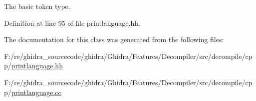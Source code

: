The basic token type. 



Definition at line 95 of file printlanguage.\+hh.



The documentation for this class was generated from the following files\+:\begin{DoxyCompactItemize}
\item 
F\+:/re/ghidra\+\_\+sourcecode/ghidra/\+Ghidra/\+Features/\+Decompiler/src/decompile/cpp/\mbox{\hyperlink{printlanguage_8hh}{printlanguage.\+hh}}\item 
F\+:/re/ghidra\+\_\+sourcecode/ghidra/\+Ghidra/\+Features/\+Decompiler/src/decompile/cpp/\mbox{\hyperlink{printlanguage_8cc}{printlanguage.\+cc}}\end{DoxyCompactItemize}
